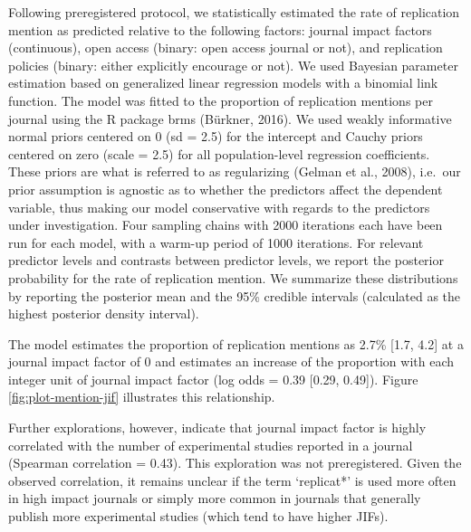 \documentclass[]{elsarticle} %
\begin{document}
Following preregistered protocol, we statistically estimated the rate of replication mention as predicted relative to the following factors:
journal impact factors (continuous), open access (binary: open access journal or not), and replication policies (binary: either explicitly encourage or not).
We used Bayesian parameter estimation based on generalized linear regression models with a binomial link function.
The model was fitted to the proportion of replication mentions per journal using the R package brms (Bürkner, 2016).
We used weakly informative normal priors centered on 0 (sd = 2.5) for the intercept and Cauchy priors centered on zero (scale = 2.5) for all population-level regression coefficients.
These priors are what is referred to as regularizing (Gelman et al., 2008), i.e.~our prior assumption is agnostic as to whether the predictors affect the dependent variable, thus making our model conservative with regards to the predictors under investigation.
Four sampling chains with 2000 iterations each have been run for each model, with a warm-up period of 1000 iterations.
For relevant predictor levels and contrasts between predictor levels, we report the posterior probability for the rate of replication mention.
We summarize these distributions by reporting the posterior mean and the 95\% credible intervals (calculated as the highest posterior density interval).

The model estimates the proportion of replication mentions as 2.7\% {[}1.7, 4.2{]} at a journal impact factor of 0 and estimates an increase of the proportion with each integer unit of journal impact factor (log odds = 0.39 {[}0.29, 0.49{]}).
Figure \ref{fig:plot-mention-jif} illustrates this relationship.

Further explorations, however, indicate that journal impact factor is highly correlated with the number of experimental studies reported in a journal (Spearman correlation = 0.43). This exploration was not preregistered.
Given the observed correlation, it remains unclear if the term `replicat*' is used more often in high impact journals or simply more common in journals that generally publish more experimental studies (which tend to have higher JIFs).
\end{document}
